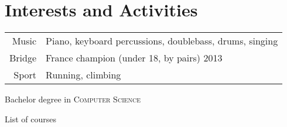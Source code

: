 \documentclass[a4paper,10pt]{article} %
\begin{document}
\section{Interests and Activities}

\begin{tabular}{rl}
  Music & Piano, keyboard percussions, doublebass, drums, singing \\
  Bridge & France champion (under 18, by pairs) 2013 \\
  Sport & Running, climbing \\
  \end{tabular}


  \vspace{2cm}


\par{\centering\Large \hypertarget{notes}{Bachelor degree in \textsc{Computer
      Science}}\par}\large{\centering List of courses\par}\normalsize
\end{document}
